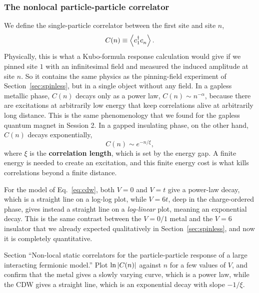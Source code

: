 \documentclass[lecture_notes.tex]{subfiles}
\begin{document}
\subsubsection{The nonlocal particle-particle correlator}
We define the single-particle correlator between the first site and site $n$,
\begin{equation}
  C(n) \equiv \expval{\cre{1}\ann{n}}.
\end{equation}
Physically, this is what a Kubo-formula response calculation would give if we pinned site $1$ with
an infinitesimal field and measured the induced amplitude at site $n$. So it contains the same
physics as the pinning-field experiment of Section~\ref{sec:spinless}, but in a single object
without any field. In a gapless metallic phase, $C(n)$ decays only as a power law,
$C(n)\sim n^{-\alpha}$, because there are excitations at arbitrarily low energy that keep
correlations alive at arbitrarily long distance. This is the same phenomenology that we found for
the gapless quantum magnet in Session 2. In a gapped insulating phase, on the other hand, $C(n)$
decays exponentially,
\begin{equation}
  C(n) \sim e^{-n/\xi},
\end{equation}
where $\xi$ is the \textbf{correlation length}, which is set by the energy gap. A finite energy is
needed to create an excitation, and this finite energy cost is what kills correlations beyond a
finite distance.

For the model of Eq.~\eqref{eq:cdw}, both $V=0$ and $V=t$ give a power-law decay, which is a
straight line on a log-log plot, while $V=6t$, deep in the charge-ordered phase, gives instead a
straight line on a \emph{log-linear} plot, meaning an exponential decay. This is the same contrast
between the $V=0/1$ metal and the $V=6$ insulator that we already expected qualitatively in
Section~\ref{sec:spinless}, and now it is completely quantitative.

\begin{notebook}
Section ``Non-local static correlators for the particle-particle response of a large interacting
fermionic model.'' Plot $\ln\abs{C(n)}$ against $n$ for a few values of $V$, and confirm that the
metal gives a slowly varying curve, which is a power law, while the CDW gives a straight line,
which is an exponential decay with slope $-1/\xi$.
\end{notebook}
\end{document}
